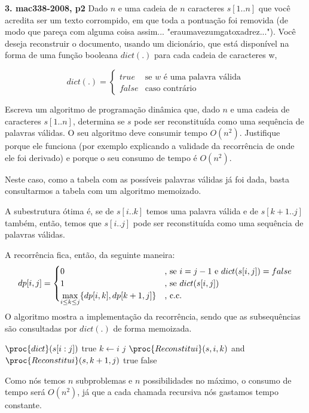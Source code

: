 
\noindent \textbf{3. mac338-2008, p2} Dado $n$ e uma cadeia de $n$ caracteres $s[1..n]$ que você acredita ser um texto corrompido, em que toda a pontuação foi removida (de modo que pareça com alguma coisa assim... "eraumavezumgatoxadrez..."). Você deseja reconstruir o documento, usando um dicionário, que está disponível na forma de uma função booleana $dict(.)$ para cada cadeia de caracteres w,

\begin{equation*}
    dict(.) =
    \begin{cases}
        true & \text{se $w$ é uma palavra válida} \\
        false & \text{caso contrário}
    \end{cases}
\end{equation*}

Escreva um algoritmo de programação dinâmica que, dado $n$ e uma cadeia de caracteres $s[1..n]$, determina se $s$ pode ser reconstituída como uma sequência de palavras válidas. O seu algoritmo deve consumir tempo $O(n^2)$. Justifique porque ele funciona (por exemplo explicando a validade da recorrência de onde ele foi derivado) e porque o seu consumo de tempo é $O(n^2)$.

Neste caso, como a tabela com as possíveis palavras válidas já foi dada, basta consultarmos a tabela com um algoritmo memoizado.

A subestrutura ótima é, se de $s[i..k]$ temos uma palavra válida e de $s[k+1..j]$ também, então, temos que $s[i..j]$ pode ser reconstituída como uma sequência de palavras válidas.

A recorrência fica, então, da seguinte maneira:
\begin{equation*}
    dp[i, j] =
    \begin{cases}
        0 & \text{, se } i = j - 1 \text{ e } dict(s[i, j]) = false \\
        1 & \text{, se } dict(s[i, j]) \\
        \smash{\displaystyle\max_{i \leq k \leq j}} \{dp[i, k], dp[k+1, j]\} & \text{, c.c.}
    \end{cases}
\end{equation*}

O algoritmo  mostra a implementação da recorrência, sendo que as subsequências são consultadas por $dict(.)$ de forma memoizada.

\begin{codebox}
\li \If $\proc{dict}(s[i:j])$
\li \Then
        \Return true
\li \Else
        \For $k \gets i$ \To $j$
\li     \Do
            \If $\proc{Reconstitui}(s, i, k)$ and $\proc{Reconstitui}(s, k+1, j)$
\li         \Then
                \Return true
            \End
        \End
    \End
\li \Return false
\end{codebox}

Como nós temos $n$ subproblemas e $n$ possibilidades no máximo, o consumo de tempo será $O(n^2)$, já que a cada chamada recursiva nós gastamos tempo constante.\\[12pt]